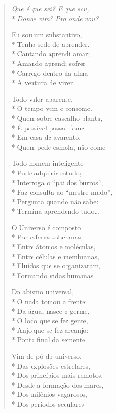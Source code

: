 \begin{verse}
\textit{Que é que sei? E que sou,}\\*
\textit{Donde vim? Pra onde vou?}

Eu sou um substantivo,\\*
Tenho sede de aprender.\\*
Cantando aprendi amar;\\*
Amando aprendi sofrer\\*
Carrego dentro da alma\\*
A ventura de viver

Todo valer aparente,\\*
O tempo vem e consome.\\*
Quem sobre cascalho planta,\\*
É possível passar fome.\\*
Em casa de avarento,\\*
Quem pede esmola, não come

Todo homem inteligente\\*
Pode adquirir estudo;\\*
Interroga o “pai dos burros”,\\*
Faz consulta ao “mestre mudo”,\\*
Pergunta quando não sabe:\\*
Termina aprendendo tudo\ldots{}

O Universo é composto\\*
Por esferas soberanas,\\*
Entre átomos e moléculas,\\*
Entre células e membranas,\\*
Fluídos que se organizaram,\\*
Formando vidas humanas

Do abismo universal,\\*
O nada tomou a frente:\\*
Da água, nasce o germe,\\*
O lodo que se fez gente,\\*
Anjo que se fez arcanjo:\\*
Ponto final da semente

Vim do pó do universo,\\*
Das explosões estrelares,\\*
Dos princípios mais remotos,\\*
Desde a formação dos mares,\\*
Dos milênios vagarosos,\\*
Dos períodos seculares


\end{verse}
